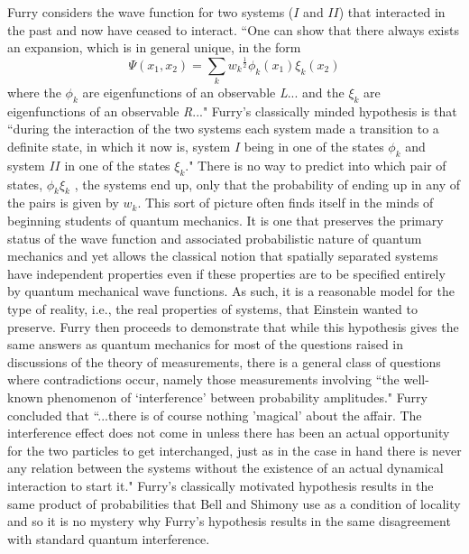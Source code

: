 \documentclass[12pt]{article}
\begin{document}
Furry\cite{Fur36a} considers the wave function for two systems ($I$ and $II$) that interacted in the past and now have ceased to interact.  ``One can show that there always exists an expansion, which is in general unique, in the form
\begin{equation}
\Psi(x_1,x_2) = \sum_k {w_k}^{\frac{1}{2}} \phi_k (x_1) \xi_k (x_2)
\end{equation}
where the $\phi_k$ are eigenfunctions of an observable {\it L}... and the $\xi_k$ are eigenfunctions of an observable {\it R}..."  Furry's classically minded hypothesis is that ``during the interaction of the two systems each system made a transition to a definite state, in which it now is, system $I$ being in one of the states $\phi_k$ and system $II$ in one of the states $\xi_k$."  There is no way to predict into which pair of states, $\phi_k\xi_k$ , the systems end up, only that the probability of ending up in any of the pairs is given by $w_k$.  This sort of picture often finds itself in the minds of beginning students of quantum mechanics.  It is one that preserves the primary status of the wave function and associated probabilistic nature of quantum mechanics and yet allows the classical notion that spatially separated systems have independent properties even if these properties are to be specified entirely by quantum mechanical wave functions.  As such, it is a reasonable model for the type of reality, i.e., the real properties of systems, that Einstein wanted to preserve.  Furry then proceeds to demonstrate that while this hypothesis gives the same answers as quantum mechanics for most of the questions raised in discussions of the theory of measurements, there is a general class of questions where contradictions occur, namely those measurements involving ``the well-known phenomenon of `interference' between probability amplitudes."  Furry concluded that ``...there is of course nothing 'magical' about the affair. The interference effect does not come in unless there has been an actual opportunity for the two particles to get interchanged, just as in the case in hand there is never any relation between the systems without the existence of an actual dynamical interaction to start it."\cite{Fur36b}  Furry's classically motivated hypothesis results in the same product of probabilities that Bell and Shimony use as a condition of locality and so it is no mystery why Furry's hypothesis results in the same disagreement with standard quantum interference.
\end{document}
